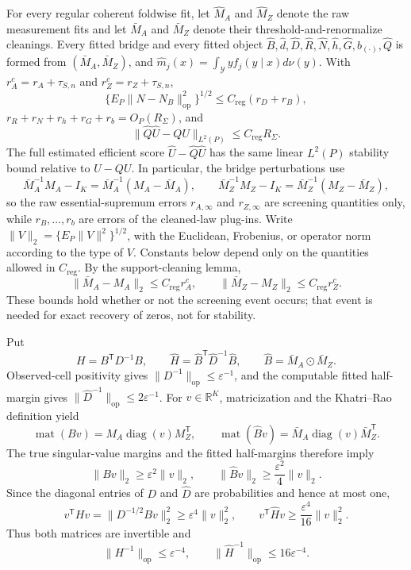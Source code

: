 For every regular coherent foldwise fit, let \(\widehat M_A\) and \(\widehat M_Z\) denote the raw measurement fits and let \(\bar M_A\) and \(\bar M_Z\) denote their threshold-and-renormalize cleanings.  Every fitted bridge and every fitted object \(\widehat B,\widehat d,\widehat D,\widehat R,\widehat N,\widehat h,\widehat G,\widehat b_{(\cdot)},\widehat Q\) is formed from \((\bar M_A,\bar M_Z)\), and \(\widehat m_j(x)=\int_{\mathcal Y}y\widehat f_j(y\mid x)d\nu(y)\).  With \(r_A^c=r_A+\tau_{S,n}\) and \(r_Z^c=r_Z+\tau_{S,n}\),
\[
 \{E_P\|\widehat N-N_B\|_{\mathrm{op}}^2\}^{1/2}
 \leq C_{\mathrm{reg}}(r_D+r_B),
\]
\(r_R+r_N+r_h+r_G+r_b=O_P(R_\Sigma)\), and
\[
 \|\widehat Q\widehat U-QU\|_{L^2(P)}
 \leq C_{\mathrm{reg}}R_\Sigma.
\]
The full estimated efficient score \(\widehat U-\widehat Q\widehat U\) has the same linear \(L^2(P)\) stability bound relative to \(U-QU\).  In particular, the bridge perturbations use
\[
 \bar M_A^{-1}M_A-I_K=\bar M_A^{-1}(M_A-\bar M_A),
 \qquad
 \bar M_Z^{-1}M_Z-I_K=\bar M_Z^{-1}(M_Z-\bar M_Z),
\]
so the raw essential-supremum errors \(r_{A,\infty}\) and \(r_{Z,\infty}\) are screening quantities only, while \(r_B,\ldots,r_b\) are errors of the cleaned-law plug-ins.
Write \(\|V\|_2=\{E_P\|V\|^2\}^{1/2}\), with the Euclidean, Frobenius, or operator norm according to the type of \(V\).  Constants below depend only on the quantities allowed in \(C_{\mathrm{reg}}\).  By the support-cleaning lemma,
\[
 \|\bar M_A-M_A\|_2\leq C_{\mathrm{reg}}r_A^c,
 \qquad
 \|\bar M_Z-M_Z\|_2\leq C_{\mathrm{reg}}r_Z^c.                 \tag{41}
\]
These bounds hold whether or not the screening event occurs; that event is needed for exact recovery of zeros, not for stability.

Put
\[
 H=B^{\mathsf T}D^{-1}B,
 \qquad
 \widehat H=\widehat B^{\mathsf T}\widehat D^{-1}\widehat B,
 \qquad
 \widehat B=\bar M_A\odot\bar M_Z.                              \tag{42}
\]
Observed-cell positivity gives \(\|D^{-1}\|_{\mathrm{op}}\leq\varepsilon^{-1}\), and the computable fitted half-margin gives \(\|\widehat D^{-1}\|_{\mathrm{op}}\leq2\varepsilon^{-1}\).  For \(v\in\mathbb R^K\), matricization and the Khatri--Rao definition yield
\[
 \operatorname{mat}(Bv)=M_A\operatorname{diag}(v)M_Z^{\mathsf T},
 \qquad
 \operatorname{mat}(\widehat Bv)=\bar M_A\operatorname{diag}(v)\bar M_Z^{\mathsf T}. \tag{43}
\]
The true singular-value margins and the fitted half-margins therefore imply
\[
 \|Bv\|_2\geq\varepsilon^2\|v\|_2,
 \qquad
 \|\widehat Bv\|_2\geq\frac{\varepsilon^2}{4}\|v\|_2.          \tag{44}
\]
Since the diagonal entries of \(D\) and \(\widehat D\) are probabilities and hence at most one,
\[
 v^{\mathsf T}Hv=\|D^{-1/2}Bv\|_2^2\geq\varepsilon^4\|v\|_2^2,
 \qquad
 v^{\mathsf T}\widehat Hv\geq\frac{\varepsilon^4}{16}\|v\|_2^2.
\]
Thus both matrices are invertible and
\[
 \|H^{-1}\|_{\mathrm{op}}\leq\varepsilon^{-4},
 \qquad
 \|\widehat H^{-1}\|_{\mathrm{op}}\leq16\varepsilon^{-4}.      \tag{45}
\]

